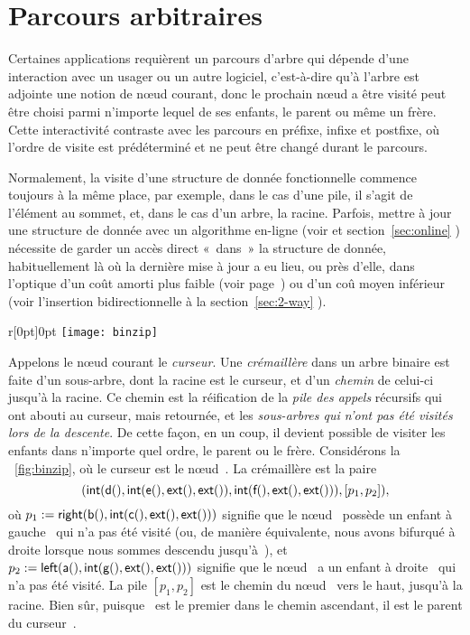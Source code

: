 \section{Parcours arbitraires}

Certaines applications requièrent un parcours d'arbre qui dépende
d'une interaction avec un usager ou un autre logiciel, c'est-à-dire
qu'à l'arbre est adjointe une notion de nœud courant, donc le
prochain nœud a être visité peut être choisi parmi n'importe
lequel de ses enfants, le parent ou même un frère. Cette interactivité
contraste avec les parcours en préfixe, infixe et postfixe, où l'ordre
de visite est prédéterminé et ne peut être changé durant le parcours.

Normalement, la visite d'une structure de donnée fonctionnelle
commence toujours à la même place, par exemple, dans le cas d'une
pile, il s'agit de l'élément au sommet, et, dans le cas d'un arbre, la
racine. Parfois, mettre à jour une structure de donnée avec un
algorithme en-ligne (voir  et
section~\ref{sec:online} ) nécessite de garder un
accès direct «~dans~» la structure de donnée, habituellement là où la
dernière mise à jour a eu lieu, ou près d'elle, dans l'optique d'un
coût amorti plus faible (voir page~\pageref{par:amortised_cost}) ou
d'un coû moyen inférieur (voir l'insertion bidirectionnelle à la
section~\ref{sec:2-way} ).

\begin{wrapfigure}[6]{r}[0pt]{0pt}
\centering
\texttt{[image: binzip]}
\caption{}
\label{fig:binzip}
\end{wrapfigure}
Appelons le nœud courant le \emph{curseur}. Une \emph{crémaillère} dans un arbre binaire est faite d'un
sous-arbre, dont la racine est le curseur, et d'un \emph{chemin} de
celui-ci jusqu'à la racine. Ce chemin est la réification de la
\emph{pile des appels}
récursifs qui ont abouti au curseur, mais retournée, et les
\emph{sous-arbres qui n'ont pas été visités lors de la descente}.  De
cette façon, en un coup, il devient possible de visiter les enfants
dans n'importe quel ordre, le parent ou le frère. Considérons la
\fig~\ref{fig:binzip}, où le curseur est le nœud~. La
crémaillère est la paire
\begin{equation*}
\pair{\fun{int}(\fun{d}(),\fun{int}(\fun{e}(),\fun{ext}(),\fun{ext}()),
\fun{int}(\fun{f}(),\fun{ext}(),\fun{ext}()))}%
{[p_1,p_2]},
\end{equation*}
où \(p_1 := \textsf{right}(\textsf{b}(), \textsf{int}(\textsf{c}(), \textsf{ext}(),
\textsf{ext}()))\) signifie que le nœud~ possède un enfant à
gauche~ qui n'a pas été visité (ou, de manière équivalente,
nous avons bifurqué à droite lorsque nous sommes descendu
jusqu'à~), et \(p_2 := \textsf{left}(\textsf{a}(),
\textsf{int}(\textsf{g}(), \textsf{ext}(), \textsf{ext}()))\) signifie que le
nœud~ a un enfant à droite~ qui n'a pas été
visité. La pile \([p_1,p_2]\) est le chemin du nœud~ vers
le haut, jusqu'à la racine. Bien sûr, puisque ~est le premier
dans le chemin ascendant, il est le parent du curseur~.

